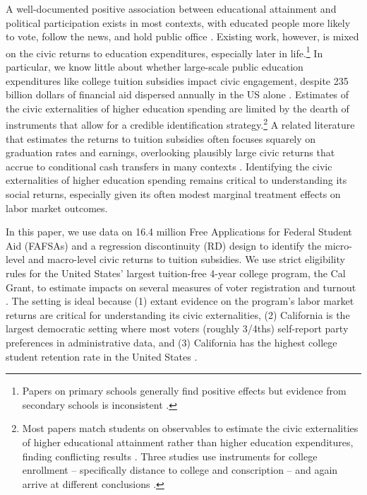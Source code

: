 \documentclass[12pt,letterpaper,oneside]{book}
\begin{document}
A well-documented positive association between educational attainment and political participation exists in most contexts, with educated people more likely to vote, follow the news, and hold public office \citep{gethin_brahmin_2021,chetty_diversifying_2023}. Existing work, however, is mixed on the civic returns to education expenditures, especially later in life.\footnote{Papers on primary schools generally find positive effects \citep{dee_are_2004,sondheimer_using_2010,wantchekon_education_2015} but evidence from secondary schools is inconsistent \citep{milligan_does_2004,tenn_effect_2007,marshall_coarsening_2016,marshall_anti-democrat_2019,cohodes_why_2021,willeck_education_2022, bommel_revisiting_2023}.} In particular, we know little about whether large-scale public education expenditures like college tuition subsidies impact civic engagement, despite 235 billion dollars of financial aid dispersed annually in the US alone \citep{college_board_trends_2023}. Estimates of the civic externalities of higher education spending are limited by the dearth of instruments that allow for a credible identification strategy.\footnote{Most papers match students on observables to estimate the civic externalities of higher educational attainment rather than higher education expenditures, finding conflicting results \citep{kam_reconsidering_2008,henderson_who_2011,mayer_does_2011,willeck_education_2022,scott_does_2022,bell_which_2024}. Three studies use instruments for college enrollment -- specifically distance to college and conscription -- and again arrive at different conclusions \citep{dee_are_2004,berinsky_education_2011,doyle_does_2017}.} A related literature that estimates the returns to tuition subsidies often focuses squarely on graduation rates and earnings, overlooking plausibly large civic returns that accrue to conditional cash transfers in many contexts \citep{manacorda_government_2011}. Identifying the civic externalities of higher education spending remains critical to understanding its social returns, especially given its often modest marginal treatment effects on labor market outcomes.


In this paper, we use data on 16.4 million Free Applications for Federal Student Aid (FAFSAs) and a regression discontinuity (RD) design to identify the micro-level and macro-level civic returns to tuition subsidies. We use strict eligibility rules for the United States' largest tuition-free 4-year college program, the Cal Grant, to estimate impacts on several measures of voter registration and turnout \citep{kane_quasi-experimental_2003,bettinger_long-run_2019,dickler_5_2022}. The setting is ideal because (1) extant evidence on the program's labor market returns are critical for understanding its civic externalities, (2) California is the largest democratic setting where most voters (roughly 3/4ths) self-report party preferences in administrative data, and (3) California has the highest college student retention rate in the United States \citep{hendren_unified_2020,van_dam_states_2022,firoozi_effect_2023}.
\end{document}

